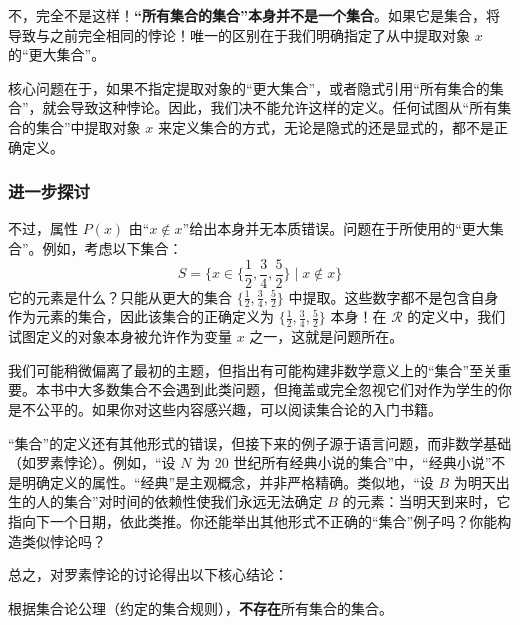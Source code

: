不，完全不是这样！\textbf{``所有集合的集合''本身并不是一个集合}。如果它是集合，将导致与之前完全相同的悖论！唯一的区别在于我们明确指定了从中提取对象 $x$ 的``更大集合''。

核心问题在于，如果不指定提取对象的``更大集合''，或者隐式引用``所有集合的集合''，就会导致这种悖论。因此，我们决不能允许这样的定义。任何试图从``所有集合的集合''中提取对象 $x$ 来定义集合的方式，无论是隐式的还是显式的，都不是正确定义。

\subsubsection*{进一步探讨}

不过，属性 $P(x)$ 由``$x \notin x$''给出本身并无本质错误。问题在于所使用的``更大集合''。例如，考虑以下集合：
\[S = \Bigg\{x \in \bigg\{\frac{1}{2}, \frac{3}{4}, \frac{5}{2}\bigg\} \mid x \notin x \Bigg\}\]
它的元素是什么？只能从更大的集合 $\{\frac{1}{2}, \frac{3}{4}, \frac{5}{2}\}$ 中提取。这些数字都不是包含自身作为元素的集合，因此该集合的正确定义为 $\{\frac{1}{2}, \frac{3}{4}, \frac{5}{2}\}$ 本身！在 $\mathcal{R}$ 的定义中，我们试图定义的对象本身被允许作为变量 $x$ 之一，这就是问题所在。

我们可能稍微偏离了最初的主题，但指出有可能构建非数学意义上的``集合''至关重要。本书中大多数集合不会遇到此类问题，但掩盖或完全忽视它们对作为学生的你是不公平的。如果你对这些内容感兴趣，可以阅读集合论的入门书籍。

``集合''的定义还有其他形式的错误，但接下来的例子源于语言问题，而非数学基础（如罗素悖论）。例如，``设 $N$ 为 20 世纪所有经典小说的集合''中，``经典小说''不是明确定义的属性。``经典''是主观概念，并非严格精确。类似地，``设 $B$ 为明天出生的人的集合''对时间的依赖性使我们永远无法确定 $B$ 的元素：当明天到来时，它指向下一个日期，依此类推。你还能举出其他形式不正确的``集合''例子吗？你能构造类似悖论吗？

总之，对罗素悖论的讨论得出以下核心结论：

\begin{center}根据集合论公理（约定的集合规则），\textbf{不存在}所有集合的集合。\end{center}
